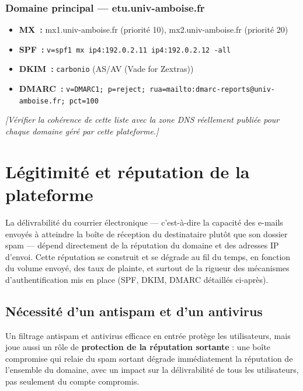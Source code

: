 \documentclass[11pt,a4paper]{report}
\newcommand{\placeholder}[1]{\textit{\textcolor{placeholdercol}{[#1]}}\par\vspace{4pt}}
\begin{document}
\subsubsection{Domaine principal --- etu.\allowbreak{}univ-\allowbreak{}amboise.\allowbreak{}fr}
\begin{itemize}[nosep]
  \item \textbf{MX~:} mx1.\allowbreak{}univ-\allowbreak{}amboise.\allowbreak{}fr (priorité 10), mx2.\allowbreak{}univ-\allowbreak{}amboise.\allowbreak{}fr (priorité 20)  \item \textbf{SPF~:} \texttt{v=spf1 mx ip4:192.\allowbreak{}0.\allowbreak{}2.\allowbreak{}11 ip4:192.\allowbreak{}0.\allowbreak{}2.\allowbreak{}12 -\allowbreak{}all}  \item \textbf{DKIM~:} \texttt{carbonio} (AS/AV (Vade for Zextras))  \item \textbf{DMARC~:} \texttt{v=DMARC1; p=reject; rua=mailto:dmarc-\allowbreak{}reports@univ-\allowbreak{}amboise.\allowbreak{}fr; pct=100}\end{itemize}


\placeholder{Vérifier la cohérence de cette liste avec la zone DNS réellement publiée pour chaque domaine géré par cette plateforme.}

\section{Légitimité et réputation de la plateforme}
\label{sec:reputation}
La délivrabilité du courrier électronique --- c'est-à-dire la capacité des e-mails envoyés à atteindre la boîte de réception du destinataire plutôt que son dossier spam --- dépend directement de la réputation du domaine et des adresses IP d'envoi. Cette réputation se construit et se dégrade au fil du temps, en fonction du volume envoyé, des taux de plainte, et surtout de la rigueur des mécanismes d'authentification mis en place (SPF, DKIM, DMARC détaillés ci-après).

\subsection{Nécessité d'un antispam et d'un antivirus}
Un filtrage antispam et antivirus efficace en entrée protège les utilisateurs, mais joue aussi un rôle de \textbf{protection de la réputation sortante} : une boîte compromise qui relaie du spam sortant dégrade immédiatement la réputation de l'ensemble du domaine, avec un impact sur la délivrabilité de tous les utilisateurs, pas seulement du compte compromis.
\end{document}

